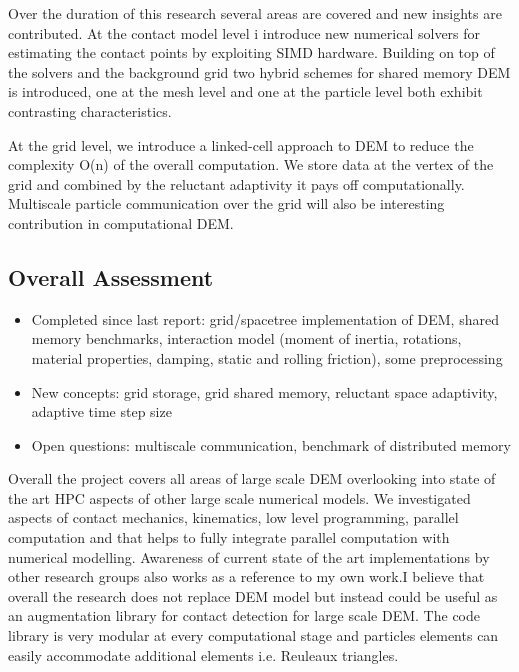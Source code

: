 \documentclass[times,12pt]{article}
\begin{document}
Over the duration of this research several areas are covered and new insights are contributed. At the contact model level i introduce new numerical solvers for estimating the contact points by exploiting SIMD hardware. Building on top of the solvers and the background grid two hybrid schemes for shared memory DEM is introduced, one at the mesh level and one at the particle level both exhibit contrasting characteristics. 

At the grid level, we introduce a linked-cell approach to DEM to reduce the complexity O(n) of the overall computation. We store data at the vertex of the grid and combined by the reluctant adaptivity it pays off computationally. Multiscale particle communication over the grid will also be interesting contribution in computational DEM.

\subsection{Overall Assessment}

\vspace{5mm}
\begin{itemize}
\item Completed since last report: grid/spacetree implementation of DEM, shared memory benchmarks, interaction model (moment of inertia, rotations, material properties, damping, static and rolling friction), some preprocessing
\item New concepts: grid storage, grid shared memory, reluctant space adaptivity, adaptive time step size
\item Open questions: multiscale communication, benchmark of distributed memory
\end{itemize}

Overall the project covers all areas of large scale DEM overlooking into state of the art HPC aspects of other large scale numerical models. We investigated aspects of contact mechanics, kinematics, low level programming, parallel computation and that helps to fully integrate parallel computation with numerical modelling. Awareness of current state of the art implementations by other research groups also works as a reference to my own work.I believe that overall the research does not replace DEM model but instead could be useful as an augmentation library for contact detection for large scale DEM. The code library is very modular at every computational stage and particles elements can easily accommodate additional elements i.e. Reuleaux triangles.   
 
\end{document}
